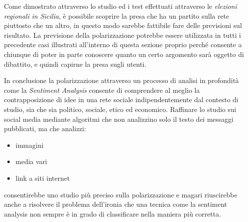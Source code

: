 Come dimostrato attraverso lo studio ed i test effettuati attraverso le \textit{elezioni regionali in Sicilia}, è possibile scoprire la presa che ha un partito sulla rete piuttosto che un altro, in questo modo sarebbe fattibile fare delle previsioni sul risultato.
La previsione della polarizzazione potrebbe essere utilizzata in tutti i precedente casi illustrati all'interno di questa sezione proprio perché consente a chiunque di poter in parte conoscere quanto un certo argomento sarà oggetto di dibattito, e quindi capirne la presa sugli utenti.

In conclusione la polarizzazione attraverso un processo di analisi in profondità come la \textit{Sentiment Analysis} consente di comprendere al meglio la contrapposizione di idee in una rete sociale indipendentemente dal contesto di studio, sia che sia politico, sociale, etico ed economico.
Raffinare lo studio sui social media mediante algoritmi che non analizzino solo il testo dei messaggi pubblicati, ma che analizzi:
\begin{itemize}
\item immagini 
\item media vari
\item link a siti internet
\end{itemize} 
consentirebbe uno studio più preciso sulla polarizzazione e magari riuscirebbe anche a risolvere il problema dell'ironia che una tecnica come la sentiment analysis non sempre è in grado di classificare nella maniera più corretta.
